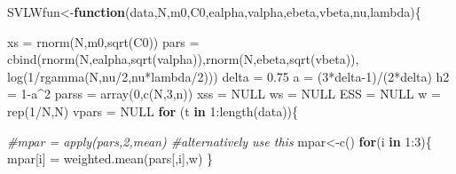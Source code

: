 \documentclass[
]{book}
\newenvironment{Shaded}{\begin{snugshade}}{\end{snugshade}}
\newcommand{\CommentTok}[1]{\textcolor[rgb]{0.56,0.35,0.01}{\textit{#1}}}
\newcommand{\ConstantTok}[1]{\textcolor[rgb]{0.00,0.00,0.00}{#1}}
\newcommand{\ControlFlowTok}[1]{\textcolor[rgb]{0.13,0.29,0.53}{\textbf{#1}}}
\newcommand{\DecValTok}[1]{\textcolor[rgb]{0.00,0.00,0.81}{#1}}
\newcommand{\FloatTok}[1]{\textcolor[rgb]{0.00,0.00,0.81}{#1}}
\newcommand{\FunctionTok}[1]{\textcolor[rgb]{0.00,0.00,0.00}{#1}}
\newcommand{\NormalTok}[1]{#1}
\newcommand{\OtherTok}[1]{\textcolor[rgb]{0.56,0.35,0.01}{#1}}
\newcommand{\SpecialCharTok}[1]{\textcolor[rgb]{0.00,0.00,0.00}{#1}}
\theoremstyle{break}
\theoremstyle{nonumberplain}
\begin{document}
\begin{Shaded}
\begin{Highlighting}[]
\NormalTok{SVLWfun}\OtherTok{\textless{}{-}}\ControlFlowTok{function}\NormalTok{(data,N,m0,C0,ealpha,valpha,ebeta,vbeta,nu,lambda)\{}
  
\NormalTok{  xs }\OtherTok{=} \FunctionTok{rnorm}\NormalTok{(N,m0,}\FunctionTok{sqrt}\NormalTok{(C0))}
\NormalTok{  pars   }\OtherTok{=} \FunctionTok{cbind}\NormalTok{(}\FunctionTok{rnorm}\NormalTok{(N,ealpha,}\FunctionTok{sqrt}\NormalTok{(valpha)),}\FunctionTok{rnorm}\NormalTok{(N,ebeta,}\FunctionTok{sqrt}\NormalTok{(vbeta)),}
                 \FunctionTok{log}\NormalTok{(}\DecValTok{1}\SpecialCharTok{/}\FunctionTok{rgamma}\NormalTok{(N,nu}\SpecialCharTok{/}\DecValTok{2}\NormalTok{,nu}\SpecialCharTok{*}\NormalTok{lambda}\SpecialCharTok{/}\DecValTok{2}\NormalTok{)))}
\NormalTok{  delta  }\OtherTok{=} \FloatTok{0.75}
\NormalTok{  a      }\OtherTok{=}\NormalTok{ (}\DecValTok{3}\SpecialCharTok{*}\NormalTok{delta}\DecValTok{{-}1}\NormalTok{)}\SpecialCharTok{/}\NormalTok{(}\DecValTok{2}\SpecialCharTok{*}\NormalTok{delta)}
\NormalTok{  h2     }\OtherTok{=} \DecValTok{1}\SpecialCharTok{{-}}\NormalTok{a}\SpecialCharTok{\^{}}\DecValTok{2}
\NormalTok{  parss  }\OtherTok{=} \FunctionTok{array}\NormalTok{(}\DecValTok{0}\NormalTok{,}\FunctionTok{c}\NormalTok{(N,}\DecValTok{3}\NormalTok{,n))}
\NormalTok{  xss    }\OtherTok{=} \ConstantTok{NULL}
\NormalTok{  ws     }\OtherTok{=} \ConstantTok{NULL}
\NormalTok{  ESS    }\OtherTok{=} \ConstantTok{NULL}
\NormalTok{  w      }\OtherTok{=} \FunctionTok{rep}\NormalTok{(}\DecValTok{1}\SpecialCharTok{/}\NormalTok{N,N)}
\NormalTok{  vpars   }\OtherTok{=} \ConstantTok{NULL}
  \ControlFlowTok{for}\NormalTok{ (t }\ControlFlowTok{in} \DecValTok{1}\SpecialCharTok{:}\FunctionTok{length}\NormalTok{(data))\{}
    
    \CommentTok{\#mpar        = apply(pars,2,mean) \#alternatively use this }
\NormalTok{    mpar}\OtherTok{\textless{}{-}}\FunctionTok{c}\NormalTok{()}
    \ControlFlowTok{for}\NormalTok{(i }\ControlFlowTok{in} \DecValTok{1}\SpecialCharTok{:}\DecValTok{3}\NormalTok{)\{}
\NormalTok{      mpar[i]    }\OtherTok{=} \FunctionTok{weighted.mean}\NormalTok{(pars[,i],w)}
\NormalTok{    \}}
    

\end{Highlighting}
\end{Shaded}
\end{document}
